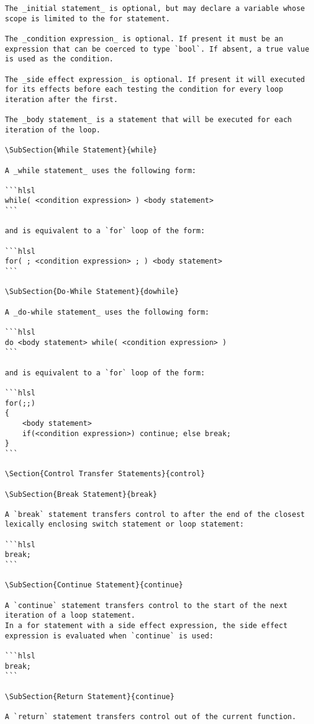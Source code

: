 \begin{verbatim}
The _initial statement_ is optional, but may declare a variable whose scope is limited to the for statement.

The _condition expression_ is optional. If present it must be an expression that can be coerced to type `bool`. If absent, a true value is used as the condition.

The _side effect expression_ is optional. If present it will executed for its effects before each testing the condition for every loop iteration after the first.

The _body statement_ is a statement that will be executed for each iteration of the loop.

\SubSection{While Statement}{while}

A _while statement_ uses the following form:

```hlsl
while( <condition expression> ) <body statement>
```

and is equivalent to a `for` loop of the form:

```hlsl
for( ; <condition expression> ; ) <body statement>
```

\SubSection{Do-While Statement}{dowhile}

A _do-while statement_ uses the following form:

```hlsl
do <body statement> while( <condition expression> )
```

and is equivalent to a `for` loop of the form:

```hlsl
for(;;)
{
	<body statement>
	if(<condition expression>) continue; else break;
}
```

\Section{Control Transfer Statements}{control}

\SubSection{Break Statement}{break}

A `break` statement transfers control to after the end of the closest lexically enclosing switch statement or loop statement:

```hlsl
break;
```

\SubSection{Continue Statement}{continue}

A `continue` statement transfers control to the start of the next iteration of a loop statement.
In a for statement with a side effect expression, the side effect expression is evaluated when `continue` is used:

```hlsl
break;
```

\SubSection{Return Statement}{continue}

A `return` statement transfers control out of the current function.


\end{verbatim}

